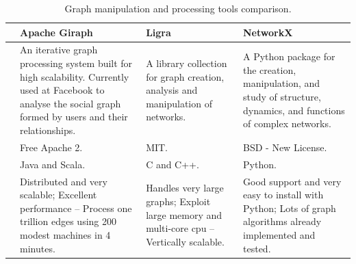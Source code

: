 \begin{table}[H]
    \caption{Graph manipulation and processing tools comparison.}
    \label{table:graph_manipulation_and_processing_tools_comparison}
    \centering
    \begin{tabularx}{\linewidth} {
            >{\hsize=0.3\hsize}X|
            >{\hsize=1.0\hsize}X|
            >{\hsize=1.0\hsize}X|
            >{\hsize=1.0\hsize}X|}
        \cline{2-4}

         & Apache Giraph \cite{apache_giraph}
         & Ligra \cite{ligra_graph_processing_framework}
         & NetworkX \cite{networkx}                                                                                                                                                       \\ \hline \hline
        \multicolumn{1}{|l|}{\textbf{Description}}
         & An iterative graph processing system built for high scalability. Currently used at Facebook to analyse the social graph formed by users and their relationships.
         & A library collection for graph creation, analysis and manipulation of networks.
         & A Python package for the creation, manipulation, and study of structure, dynamics, and functions of complex networks.                                                          \\ \hline
        \multicolumn{1}{|l|}{\textbf{Licence}~\cite{Morin2012}}
         & Free Apache 2.
         & MIT.
         & BSD - New License.                                                                                                                                                             \\ \hline
        \multicolumn{1}{|p{2cm}|}{\textbf{Supported languages}}
         & Java and Scala.
         & C and C++.
         & Python.                                                                                                                                                                        \\ \hline
        \multicolumn{1}{|l|}{\textbf{Pros}}
         & Distributed and very scalable; \newline
        Excellent performance -- Process one trillion edges using 200 modest machines in 4 minutes.
         & Handles very large graphs; \newline
        Exploit large memory and multi-core \gls{cpu} -- Vertically scalable.
         & Good support and very easy to install with Python; \newline
        Lots of graph algorithms already implemented and tested. \newline                                                                                                                 \\ \hline

\end{tabularx}
\end{table}
